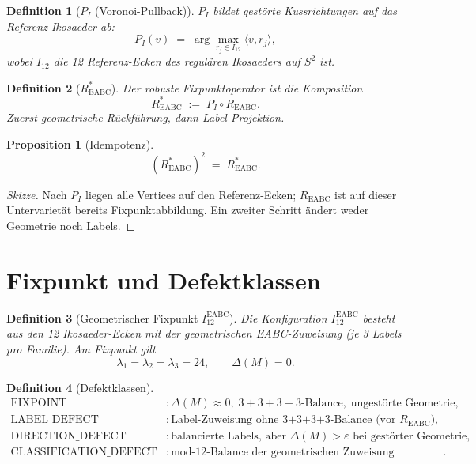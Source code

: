 \documentclass[11pt,a4paper]{article}
\newtheorem{definition}{Definition}
\newtheorem{proposition}{Proposition}
\begin{document}
\begin{definition}[$P_I$ (Voronoi-Pullback)]
$P_I$ bildet gestörte Kussrichtungen auf das Referenz-Ikosaeder ab:
\[
  P_I(v) \;=\; \arg\max_{r_j\in I_{12}} \langle v, r_j\rangle,
\]
wobei $I_{12}$ die 12 Referenz-Ecken des regulären Ikosaeders auf $S^2$ ist.
\end{definition}

\begin{definition}[$R^*_{\mathrm{EABC}}$]
Der robuste Fixpunktoperator ist die Komposition
\[
  R^*_{\mathrm{EABC}} \;:=\; P_I \circ R_{\mathrm{EABC}}.
\]
Zuerst geometrische Rückführung, dann Label-Projektion.
\end{definition}

\begin{proposition}[Idempotenz]
\[
  (R^*_{\mathrm{EABC}})^2 \;=\; R^*_{\mathrm{EABC}}.
\]
\end{proposition}

\begin{proof}[Skizze]
Nach $P_I$ liegen alle Vertices auf den Referenz-Ecken; $R_{\mathrm{EABC}}$ ist
auf dieser Untervarietät bereits Fixpunktabbildung. Ein zweiter Schritt ändert
weder Geometrie noch Labels.
\end{proof}

\section{Fixpunkt und Defektklassen}

\begin{definition}[Geometrischer Fixpunkt $I_{12}^{\mathrm{EABC}}$]
Die Konfiguration $I_{12}^{\mathrm{EABC}}$ besteht aus den 12 Ikosaeder-Ecken
mit der geometrischen EABC-Zuweisung (je 3 Labels pro Familie).
Am Fixpunkt gilt
\[
  \lambda_1 = \lambda_2 = \lambda_3 = 24, \qquad \Delta(M) = 0.
\]
\end{definition}

\begin{definition}[Defektklassen]
\begin{align*}
  \text{FIXPOINT}            &\colon \Delta(M)\approx 0,\; 3{+}3{+}3{+}3\text{-Balance},\; \text{ungestörte Geometrie},\\
  \text{LABEL\_DEFECT}       &\colon \text{Label-Zuweisung ohne 3+3+3+3-Balance (vor } R_{\mathrm{EABC}}\text{)},\\
  \text{DIRECTION\_DEFECT}   &\colon \text{balancierte Labels, aber }\Delta(M)>\varepsilon \text{ bei gestörter Geometrie},\\
  \text{CLASSIFICATION\_DEFECT} &\colon \text{mod-}12\text{-Balance der geometrischen Zuweisung gebrochen}.
\end{align*}
\end{definition}
\end{document}
